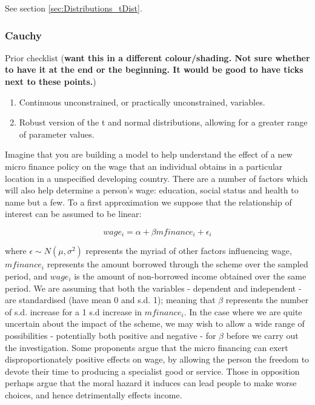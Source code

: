 \documentclass[11pt,fullpage]{book}
\begin{document}
See section \ref{sec:Distributions_tDist}.

\subsubsection{Cauchy}\label{sec:Distributions_cauchy}
Prior checklist (\textbf{want this in a different colour/shading. Not sure whether to have it at the end or the beginning. It would be good to have ticks next to these points.})

\begin{enumerate} 
\item Continuous unconstrained, or practically unconstrained, variables.
\item Robust version of the t and normal distributions, allowing for a greater range of parameter values.
\end{enumerate}

Imagine that you are building a model to help understand the effect of a new micro finance policy on the wage that an individual obtains in a particular location in a unspecified developing country. There are a number of factors which will also help determine a person's wage: education, social status and health to name but a few. To a first approximation we suppose that the relationship of interest can be assumed to be linear:

\begin{equation}
wage_i = \alpha + \beta mfinance_i + \epsilon_i
\end{equation}

where $\epsilon\sim N(\mu,\sigma^2)$ represents the myriad of other factors influencing wage, $mfinance_i$ represents the amount borrowed through the scheme over the sampled period, and $wage_i$ is the amount of non-borrowed income obtained over the same period. We are assuming that both the variables - dependent and independent - are standardised (have mean 0 and s.d. 1); meaning that $\beta$ represents the number of s.d. increase for a 1 s.d increase in $mfinance_i$. In the case where we are quite uncertain about the impact of the scheme, we may wish to allow a wide range of possibilities - potentially both positive and negative - for $\beta$ before we carry out the investigation. Some proponents argue that the micro financing can exert disproportionately positive effects on wage, by allowing the person the freedom to devote their time to producing a specialist good or service. Those in opposition perhaps argue that the moral hazard it induces can lead people to make worse choices, and hence detrimentally effects income.
\end{document}
